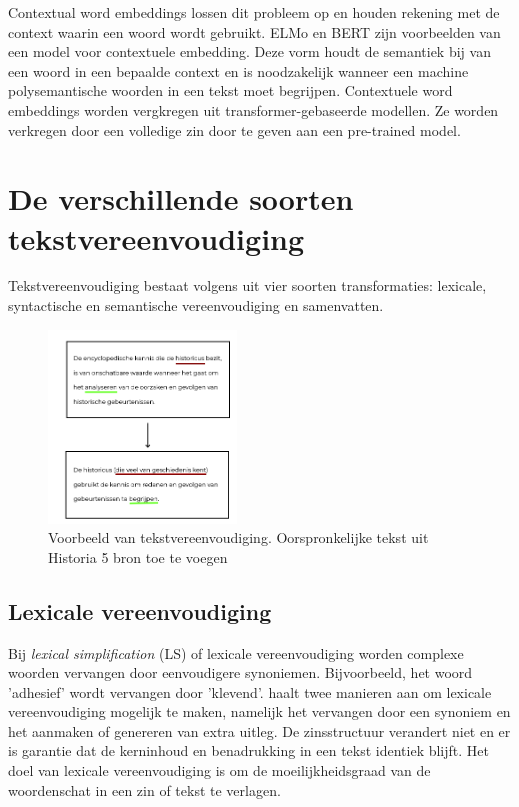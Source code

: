 Contextual word embeddings lossen dit probleem op en houden rekening met de context waarin een woord wordt gebruikt. ELMo en BERT zijn voorbeelden van een model voor contextuele embedding. Deze vorm houdt de semantiek bij van een woord in een bepaalde context en is noodzakelijk wanneer een machine polysemantische woorden in een tekst moet begrijpen. Contextuele word embeddings worden vergkregen uit transformer-gebaseerde modellen. Ze worden verkregen door een volledige zin door te geven aan een pre-trained model.



\section{De verschillende soorten tekstvereenvoudiging}

Tekstvereenvoudiging bestaat volgens \textcite{Siddharthan2014} uit vier soorten transformaties: lexicale, syntactische en semantische vereenvoudiging en samenvatten.

\begin{figure}[H]
	\begin{center}
			\includegraphics[width=5cm]{img/voorbeeld-manuele-vereenvoudiging.png}
	\end{center}
	\caption{Voorbeeld van tekstvereenvoudiging. Oorspronkelijke tekst uit Historia 5 bron toe te voegen}
\end{figure}

\subsection{Lexicale vereenvoudiging}

Bij \textit{lexical simplification} (LS) of lexicale vereenvoudiging worden complexe woorden vervangen door eenvoudigere synoniemen. Bijvoorbeeld, het woord 'adhesief' wordt vervangen door 'klevend'. \textcite{Kandula2010} haalt twee manieren aan om lexicale vereenvoudiging mogelijk te maken, namelijk het vervangen door een synoniem en het aanmaken of genereren van extra uitleg. De zinsstructuur verandert niet en er is garantie dat de kerninhoud en benadrukking in een tekst identiek blijft. Het doel van lexicale vereenvoudiging is om de moeilijkheidsgraad van de woordenschat in een zin of tekst te verlagen. 

